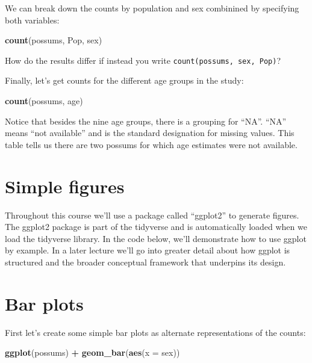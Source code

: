 \documentclass[]{book}
\newenvironment{Shaded}{\begin{snugshade}}{\end{snugshade}}
\newcommand{\DataTypeTok}[1]{\textcolor[rgb]{0.13,0.29,0.53}{#1}}
\newcommand{\KeywordTok}[1]{\textcolor[rgb]{0.13,0.29,0.53}{\textbf{#1}}}
\newcommand{\NormalTok}[1]{#1}
\newcommand{\OperatorTok}[1]{\textcolor[rgb]{0.81,0.36,0.00}{\textbf{#1}}}
\newcommand{\StringTok}[1]{\textcolor[rgb]{0.31,0.60,0.02}{#1}}
\theoremstyle{definition}
\theoremstyle{definition}
\theoremstyle{definition}
\theoremstyle{remark}
\begin{document}
We can break down the counts by population and sex combinined by
specifying both variables:

\begin{Shaded}
\begin{Highlighting}[]
\KeywordTok{count}\NormalTok{(possums, Pop, sex)}
\end{Highlighting}
\end{Shaded}

How do the results differ if instead you write
\texttt{count(possums,\ sex,\ Pop)}?

Finally, let's get counts for the different age groups in the study:

\begin{Shaded}
\begin{Highlighting}[]
\KeywordTok{count}\NormalTok{(possums, age)}
\end{Highlighting}
\end{Shaded}

Notice that besides the nine age groups, there is a grouping for ``NA''.
``NA'' means ``not available'' and is the standard designation for
missing values. This table tells us there are two possums for which age
estimates were not available.

\hypertarget{simple-figures}{%
\section{Simple figures}\label{simple-figures}}

Throughout this course we'll use a package called ``ggplot2'' to
generate figures. The ggplot2 package is part of the tidyverse and is
automatically loaded when we load the tidyverse library. In the code
below, we'll demonstrate how to use ggplot by example. In a later
lecture we'll go into greater detail about how ggplot is structured and
the broader conceptual framework that underpins its design.

\hypertarget{bar-plots}{%
\section{Bar plots}\label{bar-plots}}

First let's create some simple bar plots as alternate representations of
the counts:

\begin{Shaded}
\begin{Highlighting}[]
\KeywordTok{ggplot}\NormalTok{(possums) }\OperatorTok{+}\StringTok{ }\KeywordTok{geom_bar}\NormalTok{(}\KeywordTok{aes}\NormalTok{(}\DataTypeTok{x =}\NormalTok{ sex))}
\end{Highlighting}
\end{Shaded}
\end{document}
